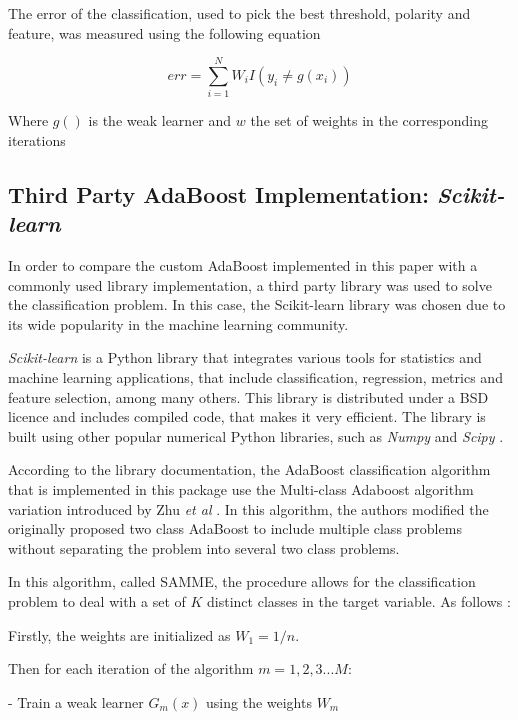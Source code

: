 \documentclass[11pt,twocolumn,letterpaper]{article}
\begin{document}
The error of the classification, used to pick the best threshold, polarity and feature, was measured using the following equation \cite{Freund1999}

\begin{equation}
	err = \sum_{i=1}^{N} W_i I(y_i \neq g(x_i))
\end{equation}

Where $g()$ is the weak learner and $w$ the set of weights in the corresponding iterations



\subsection{Third Party AdaBoost Implementation: \textit{Scikit-learn}}

In order to compare the custom AdaBoost implemented in this paper with a commonly used library implementation, a third party library was used to solve the classification problem. In this case, the Scikit-learn library was chosen due to its wide popularity in the machine learning community.

\textit{Scikit-learn} is a Python library that integrates various tools for statistics and machine learning applications, that include classification, regression, metrics and feature selection, among many others. This library is distributed under a BSD licence and includes compiled code, that makes it very efficient. The library is built using other popular numerical Python libraries, such as \textit{Numpy} and \textit{Scipy} \cite{Pedregosa2011}.

According to the library documentation, the AdaBoost classification algorithm that is implemented in this package use the Multi-class Adaboost algorithm variation introduced by Zhu \textit{et al} \cite{Zhu2009}. In this algorithm, the authors modified the originally proposed two class AdaBoost \cite{Freund1999} to include multiple class problems without separating the problem into several two class problems.

In this algorithm, called SAMME, the procedure allows for the classification problem to deal with a set of $K$ distinct classes in the target variable. As follows \cite{Zhu2009}:

Firstly, the weights are initialized as $W_1 = 1/n$. 

Then for each iteration of the algorithm $m = 1,2,3...M$:

- Train a weak learner $G_m(x)$ using the weights $W_m$
\end{document}
